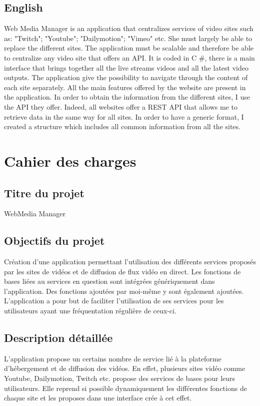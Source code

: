 \documentclass[11pt]{report} %
\begin{document}
	\section{English}
		Web Media Manager is an application that centralizes services of video sites such as: "Twitch";
		"Youtube"; "Dailymotion"; "Vimeo" etc. She must largely be able to replace the
		different sites. The application must be scalable and therefore be able to centralize any video site
		that offers an API.
		It is coded in C \#, there is a main interface that brings together all the live streams videos
		and all the latest video outputs. The application give the possibility to navigate
		through the content of each site separately. All the main features offered by the website are present in
		the application.
		In order to obtain the information from the different sites, I use the API they offer. Indeed, all websites
		offer a REST API that allows me to retrieve data in the same way for all sites. In order to have a
		generic format, I created a structure which includes all common information from all the sites.
		
\chapter{Cahier des charges}
	\section{Titre du projet}
	WebMedia Manager

	\section{Objectifs du projet}
	Création d’une application permettant l’utilisation des différents services proposés par les sites de vidéos et de diffusion de flux vidéo en direct.
	Les fonctions de bases liées au services en question sont intégrées génériquement dans l’application.
	Des fonctions ajoutées par moi-même y sont également ajoutées.
	L’application a pour but de faciliter l’utilisation de ses services pour les utilisateurs ayant une fréquentation régulière de ceux-ci.

	\section{Description détaillée}
	L’application propose un certains nombre de service lié à la plateforme d’hébergement et de diffusion des vidéos. En effet, plusieurs sites vidéo comme Youtube, Dailymotion, Twitch etc. propose des services de bases pour leurs utilisateurs.
	Elle reprend si possible dynamiquement les différentes fonctions de chaque site et les proposes dans une interface crée à cet effet.
\end{document}
